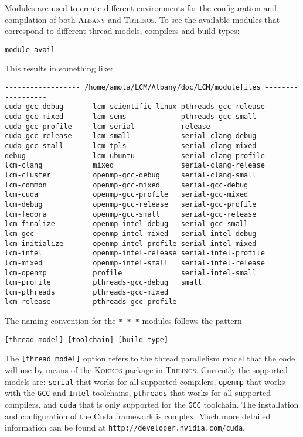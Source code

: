 \documentclass{article}
\newcommand{\trilinos}{\textsc{Trilinos}}
\newcommand{\albany}{\textsc{Albany}}
\newcommand{\kokkos}{\textsc{Kokkos}}
\begin{document}
Modules are used to create different environments for the
configuration and compilation of both \albany{} and \trilinos{}. To
see the available modules that correspond to different thread models,
compilers and build types:
\begin{verbatim}
module avail
\end{verbatim}
This results in something like:
\begin{verbatim}
------------------ /home/amota/LCM/Albany/doc/LCM/modulefiles ------------------
cuda-gcc-debug       lcm-scientific-linux pthreads-gcc-release
cuda-gcc-mixed       lcm-sems             pthreads-gcc-small
cuda-gcc-profile     lcm-serial           release
cuda-gcc-release     lcm-small            serial-clang-debug
cuda-gcc-small       lcm-tpls             serial-clang-mixed
debug                lcm-ubuntu           serial-clang-profile
lcm-clang            mixed                serial-clang-release
lcm-cluster          openmp-gcc-debug     serial-clang-small
lcm-common           openmp-gcc-mixed     serial-gcc-debug
lcm-cuda             openmp-gcc-profile   serial-gcc-mixed
lcm-debug            openmp-gcc-release   serial-gcc-profile
lcm-fedora           openmp-gcc-small     serial-gcc-release
lcm-finalize         openmp-intel-debug   serial-gcc-small
lcm-gcc              openmp-intel-mixed   serial-intel-debug
lcm-initialize       openmp-intel-profile serial-intel-mixed
lcm-intel            openmp-intel-release serial-intel-profile
lcm-mixed            openmp-intel-small   serial-intel-release
lcm-openmp           profile              serial-intel-small
lcm-profile          pthreads-gcc-debug   small
lcm-pthreads         pthreads-gcc-mixed
lcm-release          pthreads-gcc-profile
\end{verbatim}
The naming convention for the \verb+*-*-*+ modules follows the pattern
\begin{verbatim}
[thread model]-[toolchain]-[build type]
\end{verbatim}
The \verb+[thread model]+ option refers to the thread parallelism
model that the code will use by means of the \kokkos{} package in
\trilinos{}. Currently the sopported models are: \verb+serial+ that
works for all supported compilers, \verb+openmp+ that works with the
\verb+GCC+ and \verb+Intel+ toolchains, \verb+pthreads+ that works for
all supported compilers, and \verb+cuda+ that is only supported for
the \verb+GCC+ toolchain. The installation and configuration of the
Cuda framework is complex. Much more detailed information can be found
at \verb+http://developer.nvidia.com/cuda+.
\end{document}
